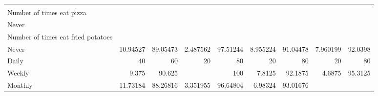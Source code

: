 \documentclass{article}
\begin{document}
\begin{tabular}{lllllllll}
  \multicolumn{1}{|r}{} &
  \multicolumn{1}{r}{} &
  \multicolumn{1}{r}{} &
  \multicolumn{1}{r}{} &
  \multicolumn{1}{r}{} &
  \multicolumn{1}{r}{} &
  \multicolumn{1}{r}{} &
  \multicolumn{1}{r}{} \\
\multicolumn{1}{l}{\hspace{2em}Number of times eat pizza} &
  \multicolumn{1}{|r}{} &
  \multicolumn{1}{r}{} &
  \multicolumn{1}{r}{} &
  \multicolumn{1}{r}{} &
  \multicolumn{1}{r}{} &
  \multicolumn{1}{r}{} &
  \multicolumn{1}{r}{} &
  \multicolumn{1}{r}{} \\
\multicolumn{1}{l}{\hspace{3em}Never} &
  \multicolumn{1}{|r}{} &
  \multicolumn{1}{r}{} &
  \multicolumn{1}{r}{} &
  \multicolumn{1}{r}{} &
  \multicolumn{1}{r}{} &
  \multicolumn{1}{r}{} &
  \multicolumn{1}{r}{} &
  \multicolumn{1}{r}{} \\
\multicolumn{1}{l}{\hspace{4em}Number of times eat fried potatoes} &
  \multicolumn{1}{|r}{} &
  \multicolumn{1}{r}{} &
  \multicolumn{1}{r}{} &
  \multicolumn{1}{r}{} &
  \multicolumn{1}{r}{} &
  \multicolumn{1}{r}{} &
  \multicolumn{1}{r}{} &
  \multicolumn{1}{r}{} \\
\multicolumn{1}{l}{\hspace{5em}Never} &
  \multicolumn{1}{|r}{10.94527} &
  \multicolumn{1}{r}{89.05473} &
  \multicolumn{1}{r}{2.487562} &
  \multicolumn{1}{r}{97.51244} &
  \multicolumn{1}{r}{8.955224} &
  \multicolumn{1}{r}{91.04478} &
  \multicolumn{1}{r}{7.960199} &
  \multicolumn{1}{r}{92.0398} \\
\multicolumn{1}{l}{\hspace{5em}Daily} &
  \multicolumn{1}{|r}{40} &
  \multicolumn{1}{r}{60} &
  \multicolumn{1}{r}{20} &
  \multicolumn{1}{r}{80} &
  \multicolumn{1}{r}{20} &
  \multicolumn{1}{r}{80} &
  \multicolumn{1}{r}{20} &
  \multicolumn{1}{r}{80} \\
\multicolumn{1}{l}{\hspace{5em}Weekly} &
  \multicolumn{1}{|r}{9.375} &
  \multicolumn{1}{r}{90.625} &
  \multicolumn{1}{r}{} &
  \multicolumn{1}{r}{100} &
  \multicolumn{1}{r}{7.8125} &
  \multicolumn{1}{r}{92.1875} &
  \multicolumn{1}{r}{4.6875} &
  \multicolumn{1}{r}{95.3125} \\
\multicolumn{1}{l}{\hspace{5em}Monthly} &
  \multicolumn{1}{|r}{11.73184} &
  \multicolumn{1}{r}{88.26816} &
  \multicolumn{1}{r}{3.351955} &
  \multicolumn{1}{r}{96.64804} &
  \multicolumn{1}{r}{6.98324} &
  \multicolumn{1}{r}{93.01676} &

\end{tabular}
\end{document}
